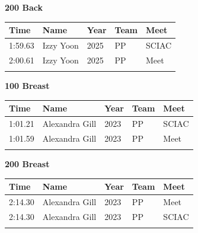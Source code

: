 \vspace{1.2em}
\noindent\begin{minipage}[t]{0.98\textwidth}
\centering
\textbf{\textcolor{teamprimary}{200 Back}}\par
\vspace{0.5em}
\centering
\small
\renewcommand{\arraystretch}{1.0}
\setlength{\tabcolsep}{4pt}
\begin{tabular}{@{}p{2.5cm}p{4.5cm}p{1.5cm}p{2.5cm}p{2.5cm}@{}}
\toprule
\textbf{Time} & \textbf{Name} & \textbf{Year} & \textbf{Team} & \textbf{Meet} \\
\midrule
1:59.63 & Izzy Yoon & 2025 & PP & SCIAC \\
2:00.61 & Izzy Yoon & 2025 & PP & Meet \\
\bottomrule
\vspace{0.5em}
\end{tabular}
\end{minipage}
\vspace{1.2em}
\noindent\begin{minipage}[t]{0.98\textwidth}
\centering
\textbf{\textcolor{teamprimary}{100 Breast}}\par
\vspace{0.5em}
\centering
\small
\renewcommand{\arraystretch}{1.0}
\setlength{\tabcolsep}{4pt}
\begin{tabular}{@{}p{2.5cm}p{4.5cm}p{1.5cm}p{2.5cm}p{2.5cm}@{}}
\toprule
\textbf{Time} & \textbf{Name} & \textbf{Year} & \textbf{Team} & \textbf{Meet} \\
\midrule
1:01.21 & Alexandra Gill & 2023 & PP & SCIAC \\
1:01.59 & Alexandra Gill & 2023 & PP & Meet \\
\bottomrule
\vspace{0.5em}
\end{tabular}
\end{minipage}
\vspace{1.2em}
\noindent\begin{minipage}[t]{0.98\textwidth}
\centering
\textbf{\textcolor{teamprimary}{200 Breast}}\par
\vspace{0.5em}
\centering
\small
\renewcommand{\arraystretch}{1.0}
\setlength{\tabcolsep}{4pt}
\begin{tabular}{@{}p{2.5cm}p{4.5cm}p{1.5cm}p{2.5cm}p{2.5cm}@{}}
\toprule
\textbf{Time} & \textbf{Name} & \textbf{Year} & \textbf{Team} & \textbf{Meet} \\
\midrule
2:14.30 & Alexandra Gill & 2023 & PP & Meet \\
2:14.30 & Alexandra Gill & 2023 & PP & SCIAC \\
\bottomrule
\vspace{0.5em}
\end{tabular}
\end{minipage}
